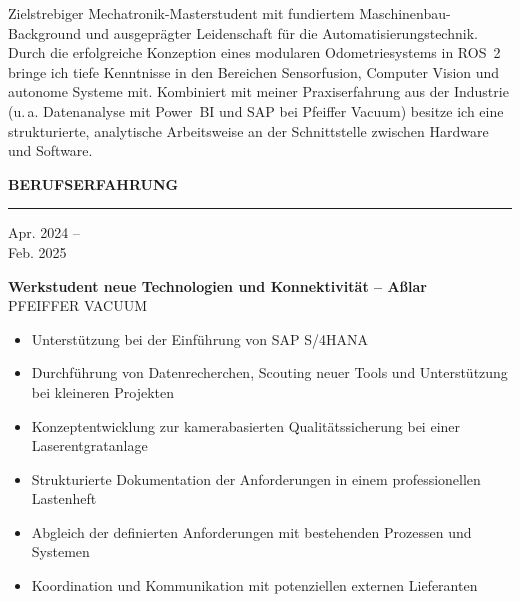 \documentclass[11pt,a4paper]{article}
\newcommand{\sectionhead}[1]{%
  \vspace{1.1em}
  {\large\bfseries\color{accent}\MakeUppercase{#1}}\\[-0.35em]
  {\color{accent!50}\rule{\linewidth}{0.5pt}}\vspace{0.5em}}
\newcommand{\entry}[4]{%
  \noindent
  \begin{minipage}[t]{2.9cm}\raggedright\small\color{lightgray}#1\end{minipage}%
  \hspace{0.3cm}%
  \begin{minipage}[t]{\dimexpr\linewidth-3.2cm\relax}
    {\normalsize\bfseries\color{black!90}#2}\\[-0.1em]
    {\small\color{accent}#3}
    \begin{itemize}[leftmargin=1.1em,itemsep=0.1em,topsep=0.3em,parsep=0pt,label={\tiny$\bullet$}]
      \small #4
    \end{itemize}
  \end{minipage}\par\vspace{0.55em}}
\begin{document}

\vspace*{2.7cm}

{\small\linespread{1.08}\selectfont
Zielstrebiger Mechatronik-Masterstudent mit fundiertem Maschinenbau-Background und ausgeprägter
Leidenschaft für die Automatisierungstechnik. Durch die erfolgreiche Konzeption eines modularen
Odometriesystems in ROS~2 bringe ich tiefe Kenntnisse in den Bereichen Sensorfusion, Computer Vision und
autonome Systeme mit. Kombiniert mit meiner Praxiserfahrung aus der Industrie (u.\,a. Datenanalyse mit
Power~BI und SAP bei Pfeiffer Vacuum) besitze ich eine strukturierte, analytische Arbeitsweise an der
Schnittstelle zwischen Hardware und Software.\par}

\sectionhead{Berufserfahrung}

\entry{Apr. 2024 --\\ Feb. 2025}
{Werkstudent neue Technologien und Konnektivität -- Aßlar}
{PFEIFFER VACUUM}
{\item Unterstützung bei der Einführung von SAP S/4HANA
 \item Durchführung von Datenrecherchen, Scouting neuer Tools und Unterstützung bei kleineren Projekten
 \item Konzeptentwicklung zur kamerabasierten Qualitätssicherung bei einer Laserentgratanlage
 \item Strukturierte Dokumentation der Anforderungen in einem professionellen Lastenheft
 \item Abgleich der definierten Anforderungen mit bestehenden Prozessen und Systemen
 \item Koordination und Kommunikation mit potenziellen externen Lieferanten}
\end{document}
